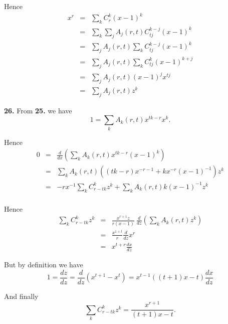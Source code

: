 \documentclass[a4paper,12pt]{article}
\newcommand{\newpar}[1]{\bigskip \noindent \textbf{#1.}}
\begin{document}
Hence
\begin{eqnarray*}
  x^r &=& \sum_k C_r^k (x-1)^k \\
  &=& \sum_k \sum_j A_j(r,t) C_{tj}^{k-j} (x-1)^k \\
  &=& \sum_j A_j(r,t) \sum_k C_{tj}^{k-j} (x-1)^k \\
  &=& \sum_j A_j(r,t) \sum_k C_{tj}^k (x-1)^{k+j} \\
  &=& \sum_j A_j(r,t) (x-1)^j x^{tj} \\
  &=& \sum_j A_j(r,t) z^k
\end{eqnarray*}

\newpar{26} From \textbf{25.} we have
\[ 1 = \sum_k A_k(r,t) x^{tk-r}x^k.\]

Hence
\begin{eqnarray*}
  0 &=& \frac{d}{dx} \left( \sum_k A_k(r,t) x^{tk-r}(x-1)^k \right) \\
  &=& \sum_k A_k(r,t) ((tk-r) x^{-r-1} + k x^{-r}(x-1)^{-1}) z^k \\
  &=& - r x^{-1} \sum_k C_{r-tk}^k z^k + \sum_k A_k(r,t) k
  (x-1)^{-1} z^k \\
\end{eqnarray*}

Hence
\begin{eqnarray*}
  \sum_k C_{r-tk}^k z^k &=& \frac{x^{r+1}z}{r(x-1)}\ \frac{d}{dz}
  \left( \sum_k A_k(r,t) z^k\right) \\
  &=& \frac{x^{1+t}}{r} \frac{d}{dz} x^r \\
  &=& x^{t+r} \frac{dx}{dz}
\end{eqnarray*}

But by definition we have
\[  1 = \frac{dz}{dz} = \frac{d}{dz}(x^{t+1}-x^t) = x^{t-1}((t+1)x - t)
\frac{dx}{dz} \]

And finally
\[ \sum_k C_{r-tk}^k z^k = \frac{x^{r+1}}{(t+1)x - t} .\]
\end{document}
